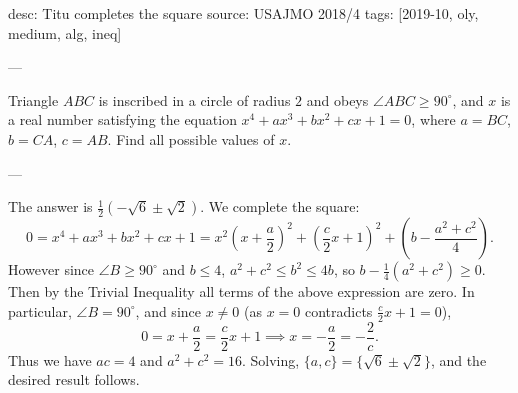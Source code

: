 desc: Titu completes the square
source: USAJMO 2018/4
tags: [2019-10, oly, medium, alg, ineq]

---

Triangle $ABC$ is inscribed in a circle of radius $2$ and obeys $\angle ABC\ge90^\circ$, and $x$ is a real number satisfying the equation $x^4+ax^3+bx^2+cx+1=0$, where $a=BC$, $b=CA$, $c=AB$. Find all possible values of $x$.

---

The answer is $\tfrac12(-\sqrt6\pm\sqrt2)$. We complete the square: \[0=x^4+ax^3+bx^2+cx+1=x^2\left(x+\frac a2\right)^2+\left(\frac c2x+1\right)^2+\left(b-\frac{a^2+c^2}4\right).\]
However since $\angle B\ge90^\circ$ and $b\le 4$, $a^2+c^2\le b^2\le 4b$, so $b-\tfrac14(a^2+c^2)\ge0$. Then by the Trivial Inequality all terms of the above expression are zero. In particular, $\angle B=90^\circ$, and since $x\ne 0$ (as $x=0$ contradicts $\tfrac c2x+1=0$), \[0=x+\frac a2=\frac c2x+1\implies x=-\frac a2=-\frac2c.\]
Thus we have $ac=4$ and $a^2+c^2=16$. Solving, $\{a,c\}=\{\sqrt6\pm\sqrt2\}$, and the desired result follows.
